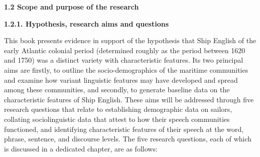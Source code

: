 \begin{styleNormali}
\textbf{1.2 Scope and purpose of the research \ }
\end{styleNormali}


\begin{styleNormali}
\textbf{1.2.1. Hypothesis, research aims and questions}
\end{styleNormali}


\begin{styleNormali}
This book presents evidence in support of the hypothesis that Ship English of the early Atlantic colonial period (determined roughly as the period between 1620 and 1750) was a distinct variety with characteristic features. Its two principal aims are firstly, to outline the socio-demographics of the maritime communities and examine how variant linguistic features may have developed and spread among these communities, and secondly, to generate baseline data on the characteristic features of Ship English. These aims will be addressed through five research questions that relate to establishing demographic data on sailors, collating sociolinguistic data that attest to how their speech communities functioned, and identifying characteristic features of their speech at the word, phrase, sentence, and discourse levels. The five research questions, each of which is discussed in a dedicated chapter, are as follows:
\end{styleNormali}



